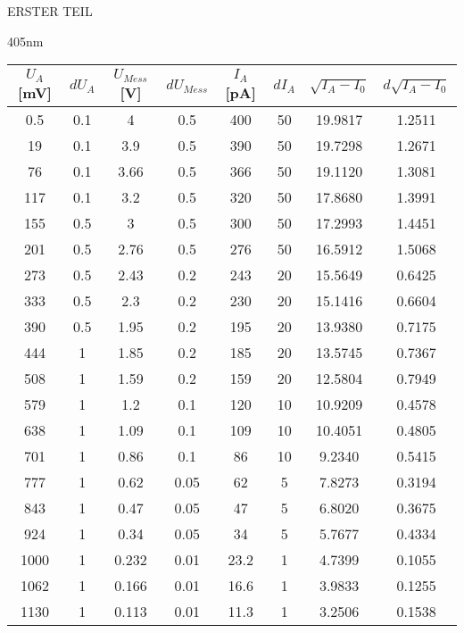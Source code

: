 \begin{appendix}
\begin{chapter}{ERSTER TEIL}
\begin{section}{405nm}
        \begin{table}[htbp]
          \centering
          \scriptsize
          \begin{tabular}{|c|c|c|c|c|c|c|c|}
            \hline
            $U_{A}$ [mV] & $dU_{A}$ & $U_{Mess}$ [V] & $dU_{Mess}$ & 
                $I_{A}$ [pA] & $dI_{A}$ & $\sqrt{I_{A}-I_0}$ & 
                $d\sqrt{I_{A}-I_0}$ \\ \hline
            0.5 & 0.1 & 4 & 0.5 & 400 & 50 & 19.9817 & 1.2511 \\ \hline
            19 & 0.1 & 3.9 & 0.5 & 390 & 50 & 19.7298 & 1.2671 \\ \hline
            76 & 0.1 & 3.66 & 0.5 & 366 & 50 & 19.1120 & 1.3081 \\ \hline
            117 & 0.1 & 3.2 & 0.5 & 320 & 50 & 17.8680 & 1.3991 \\ \hline
            155 & 0.5 & 3 & 0.5 & 300 & 50 & 17.2993 & 1.4451 \\ \hline
            201 & 0.5 & 2.76 & 0.5 & 276 & 50 & 16.5912 & 1.5068 \\ \hline
            273 & 0.5 & 2.43 & 0.2 & 243 & 20 & 15.5649 & 0.6425 \\ \hline
            333 & 0.5 & 2.3 & 0.2 & 230 & 20 & 15.1416 & 0.6604 \\ \hline
            390 & 0.5 & 1.95 & 0.2 & 195 & 20 & 13.9380 & 0.7175 \\ \hline
            444 & 1 & 1.85 & 0.2 & 185 & 20 & 13.5745 & 0.7367 \\ \hline
            508 & 1 & 1.59 & 0.2 & 159 & 20 & 12.5804 & 0.7949 \\ \hline
            579 & 1 & 1.2 & 0.1 & 120 & 10 & 10.9209 & 0.4578 \\ \hline
            638 & 1 & 1.09 & 0.1 & 109 & 10 & 10.4051 & 0.4805 \\ \hline
            701 & 1 & 0.86 & 0.1 & 86 & 10 & 9.2340 & 0.5415 \\ \hline
            777 & 1 & 0.62 & 0.05 & 62 & 5 & 7.8273 & 0.3194 \\ \hline
            843 & 1 & 0.47 & 0.05 & 47 & 5 & 6.8020 & 0.3675 \\ \hline
            924 & 1 & 0.34 & 0.05 & 34 & 5 & 5.7677 & 0.4334 \\ \hline
            1000 & 1 & 0.232 & 0.01 & 23.2 & 1 & 4.7399 & 0.1055 \\ \hline
            1062 & 1 & 0.166 & 0.01 & 16.6 & 1 & 3.9833 & 0.1255 \\ \hline
            1130 & 1 & 0.113 & 0.01 & 11.3 & 1 & 3.2506 & 0.1538 \\ \hline

\end{tabular}
\end{table}
\end{section}
\end{chapter}
\end{appendix}
